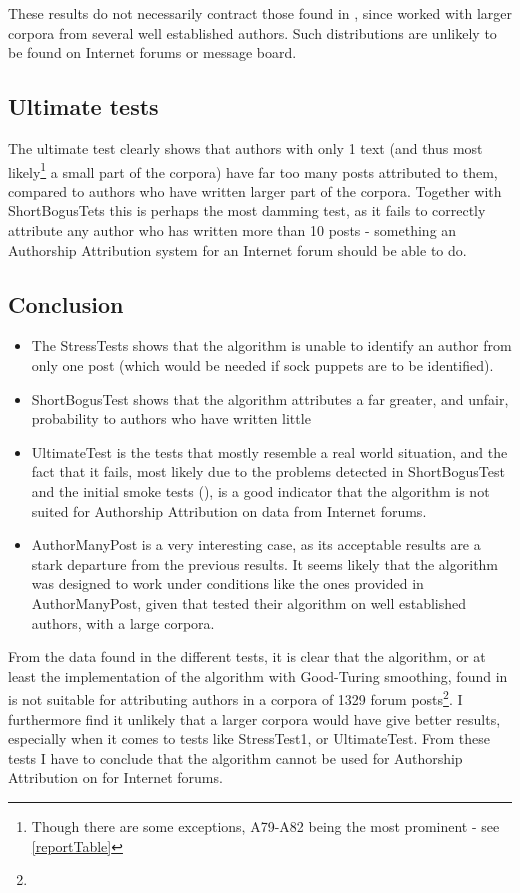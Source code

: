 These results do not necessarily contract those found in \cite{nr4}, since \cite{nr4} worked with larger corpora from several well established authors. Such distributions are unlikely to be found on Internet forums or message board. 

\subsection{Ultimate tests}
The ultimate test clearly shows that authors with only 1 text (and thus most likely\footnote{Though there are some exceptions, A79-A82 being the most prominent - see \ref{reportTable}} a small part of the corpora) have far too many posts attributed to them, compared to authors who have written larger part of the corpora. Together with ShortBogusTets this is perhaps the most damming test, as it fails to correctly attribute any author who has written more than 10 posts - something an Authorship Attribution system for an Internet forum should be able to do.  

\subsection{Conclusion}
\begin{itemize}
\item The StressTests shows that the algorithm is unable to identify an author from only one post (which would be needed if sock puppets are to be identified). 
\item ShortBogusTest shows that the algorithm attributes a far greater, and unfair, probability to authors who have written little
\item UltimateTest is the tests that mostly resemble a real world situation, and the fact that it fails, most likely due to the problems detected in ShortBogusTest and the initial smoke tests (), is a good indicator that the algorithm is not suited for Authorship Attribution on data from Internet forums.
\item AuthorManyPost is a very interesting case, as its acceptable results are a stark departure from the previous results. It seems likely that the algorithm was designed to work under conditions like the ones provided in AuthorManyPost, given that \cite{nr4} tested their algorithm on well established authors, with a large corpora.
\end{itemize}

From the data found in the different tests, it is clear that the algorithm, or at least the implementation of the algorithm with Good-Turing smoothing, found in \cite{nr4} is not suitable for attributing authors in a corpora of 1329 forum posts\footnote{}. I furthermore find it unlikely that a larger corpora would have give better results, especially when it comes to tests like StressTest1, or UltimateTest. From these tests I have to conclude that the algorithm cannot be used for Authorship Attribution on for Internet forums.
